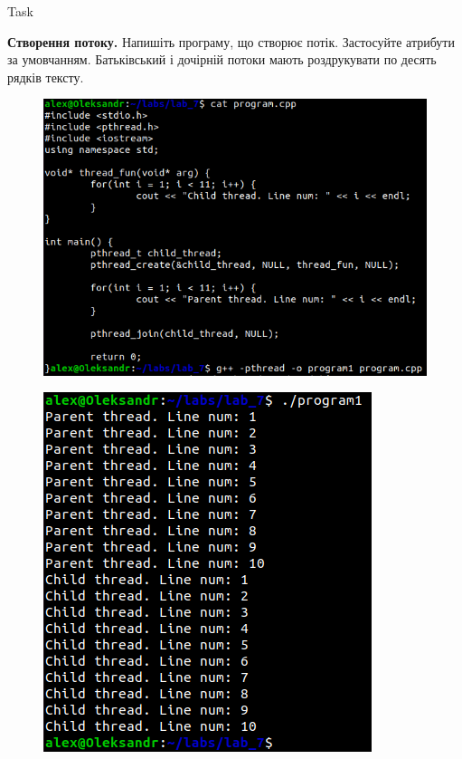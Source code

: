 \documentclass[a4paper,12pt]{article}
\newcommand{\RomanNumeralCaps}[1]{\MakeUppercase{\romannumeral #1}}
\begin{document}
\newpage
    \begin{center}
        \Large{Task \RomanNumeralCaps{1}}
    \end{center}
    \textbf{Створення потоку.} Напишіть програму, що створює потік.
    Застосуйте атрибути за умовчанням. Батьківський і дочірній потоки мають роздрукувати по десять рядків тексту.
    \begin{figure}[h!]
        \begin{minipage}[h]{1\linewidth}
            \centering
            \includegraphics[width=0.6\linewidth]{Prt sc/Figure_1_1.png}  
        \end{minipage}
    \end{figure}
    \begin{figure}[h!]
        \begin{minipage}[h]{1\linewidth}
            \centering
            \includegraphics[width=0.5\linewidth]{Prt sc/Figure_1_2.png}  
        \end{minipage}
    \end{figure}
\end{document}
